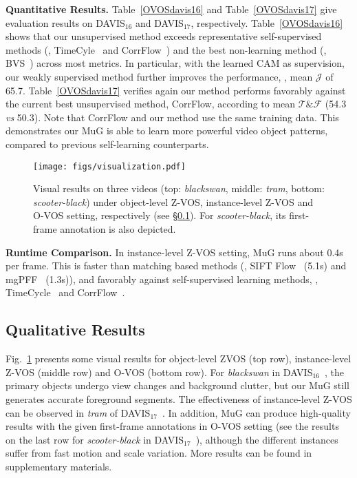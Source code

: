 \documentclass[10pt,twocolumn,letterpaper]{article}
\begin{document}
\noindent\textbf{Quantitative Results.} Table~\!\ref{OVOSdavis16} and Table~\!\ref{OVOSdavis17} give evaluation results on DAVIS$_{16}$ and DAVIS$_{17}$, respectively. Table~\!\ref{OVOSdavis16} shows that our unsupervised method exceeds  representative self-supervised methods (\ie, TimeCyle~\!\cite{CVPR2019_CycleTime} and CorrFlow~\!\cite{CVPR2019_CycleTime}) and the best non-learning method (\ie, BVS~\!\cite{DBLP:conf/cvpr/MarkiPWS16}) across most metrics. In particular, with the learned CAM as supervision, our weakly supervised method further improves the performance, \eg, mean $\mathcal{J}$ of 65.7. Table~\ref{OVOSdavis17} verifies again our method performs favorably against the current best unsupervised method, CorrFlow, according to mean $\mathcal{T}\&\mathcal{F}$ (54.3 \textit{vs} 50.3). Note  that CorrFlow and our method use the same training data. This demonstrates our MuG is able to learn more powerful video object patterns, compared to previous self-learning counterparts.

\begin{figure}[t]
	\centering
	\texttt{[image: figs/visualization.pdf]}
	\vspace*{-18pt}	
	\captionsetup{font=small}
	\caption{\small Visual results on three videos (top: \textit{blackswan}, middle: \textit{tram}, bottom: \textit{scooter-black}) under object-level Z-VOS, instance-level Z-VOS and O-VOS setting,  respectively (see \!\S\ref{sec:visualization}). For \textit{scooter-black}, its first-frame annotation is also depicted.}
	\label{fig:visualization}	
	\vspace*{-18pt}	
\end{figure}


\noindent\textbf{Runtime Comparison.}
In instance-level Z-VOS setting, MuG runs about 0.4s per frame. This is faster than matching based methods (\eg, SIFT Flow~\!\cite{liu2010sift} (5.1s) and mgPFF~\!\cite{kong2019multigrid} (1.3s)), and favorably against self-supervised learning methods, \eg, TimeCycle~\!\cite{CVPR2019_CycleTime} and CorrFlow~\!\cite{Lai19}. \vspace{-3pt}
\subsection{Qualitative Results}
\label{sec:visualization}
\vspace{-2pt}
Fig.~\!\ref{fig:visualization} presents some visual results for object-level ZVOS (top row), instance-level Z-VOS (middle row) and O-VOS (bottom row).
For \textit{blackswan} in DAVIS$_{16}$~\!\cite{perazzi2016benchmark}, the primary objects undergo  view changes and background clutter, but our MuG still generates accurate foreground segments. The effectiveness of instance-level Z-VOS can be observed in \textit{tram} of DAVIS$_{17}$~\!\cite{Caelles_arXiv_2019}. In addition, MuG can produce high-quality results with the given first-frame annotations in O-VOS setting (see the results on the last row for \textit{scooter-black} in DAVIS$_{17}$~\!\cite{pont20172017}), although the different instances suffer from fast motion and scale variation. More results can be found in supplementary materials.
\end{document}
